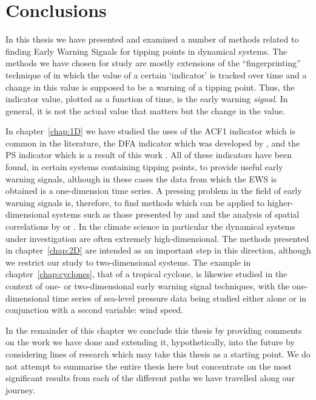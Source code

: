 
\chapter{Conclusions}
\label{chap:Conc}

\graphicspath{{Chap_Conclusion/Figs/}}
	
	In this thesis we have presented and examined a number of methods related to finding Early Warning Signals for tipping points in dynamical systems. The methods we have chosen for study are mostly extensions of the ``fingerprinting'' technique of \cite{held2004} in which the value of a certain `indicator' is tracked over time and a change in this value is supposed to be a warning of a tipping point. Thus, the indicator value, plotted as a function of time, is the early warning \emph{signal}. In general, it is not the actual value that matters but the change in the value.
	
	In chapter~\ref{chap:1D} we have studied the uses of the ACF1 indicator which is common in the literature, the DFA indicator which was developed by \cite{livina2007}, and the PS indicator which is a result of this work \citep{prettyman2018,prettyman2019}. All of these indicators have been found, in certain systems containing tipping points, to provide useful early warning signals, although in these cases the data from which the EWS is obtained is a one-dimension time series. A pressing problem in the field of early warning signals is, therefore, to find methods which can be applied to higher-dimensional systems such as those presented by \cite{williamson2015} and \cite{williamson2016} and the analysis of spatial correlations by \cite{bathiany2013p2} or \cite{kefi2014early}. In the climate science in particular the dynamical systems under investigation are often extremely high-dimensional. The methods presented in chapter~\ref{chap:2D} are intended as an important step in this direction, although we restrict our study to two-dimensional systems. The example in chapter~\ref{chap:cyclones}, that of a tropical cyclone, is likewise studied in the context of one- or two-dimensional early warning signal techniques, with the one-dimensional time series of sea-level pressure data being studied either alone or in conjunction with a second variable: wind speed. 
	
	In the remainder of this chapter we conclude this thesis by providing comments on the work we have done and extending it, hypothetically, into the future by considering lines of research which may take this thesis as a starting point. We do not attempt to summarise the entire thesis here but concentrate on the most significant results from each of the different paths we have travelled along our journey. 
	
